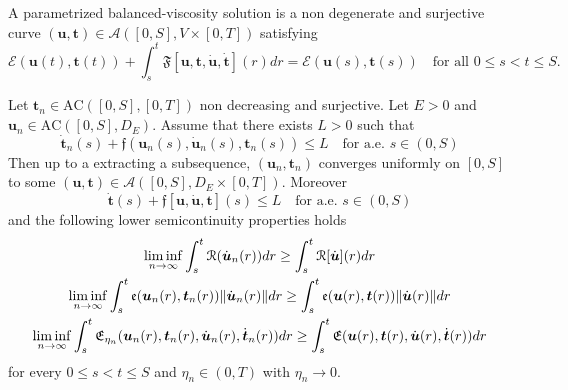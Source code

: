 \begin{defi}
A parametrized balanced-viscosity solution is a non degenerate and surjective curve $(\boldsymbol{u},\boldsymbol{t})\in\mathscr{A}([0,S],V\times[0,T])$ satisfying
\[
\mathcal{E}(\boldsymbol{u}(t),\boldsymbol{t}(t))+\int_s^t\mathfrak{F}[\boldsymbol{u},\boldsymbol{t},\dot{\boldsymbol{u}},\dot{\boldsymbol{t}}](r)dr=\mathcal{E}(\boldsymbol{u}(s),\boldsymbol{t}(s))\quad\text{for all $0\le s<t\le S$}.
\]
\end{defi}
\begin{lemma}
\label{lemma:compactness-parametrized}
Let $\boldsymbol{t}_n\in\text{AC}([0,S],[0,T])$ non decreasing and surjective. Let $E>0$ and $\boldsymbol{u}_n\in\text{AC}([0,S],D_E)$. Assume that there exists $L>0$ such that
\begin{equation}
\label{eqn:parametrized-curves-estimate-for-compactness}
\dot{\boldsymbol{t}}_n(s)+\mathfrak{f}(\boldsymbol{u}_n(s),\dot{\boldsymbol{u}}_n(s),\boldsymbol{t}_n(s))\le L\quad\text{for a.e.\ $s\in(0,S)$}
\end{equation}
Then up to a extracting a subsequence, $(\boldsymbol{u}_n,\boldsymbol{t}_n)$ converges uniformly on $[0,S]$ to some $(\boldsymbol{u},\boldsymbol{t})\in\mathscr{A}([0,S],D_E\times[0,T])$. Moreover
\[
\dot{\boldsymbol{t}}(s)+\mathfrak{f}[\boldsymbol{u},\dot{\boldsymbol{u}},\boldsymbol{t}](s)\le L\quad\text{for a.e.\ $s\in(0,S)$}
\]
and the following lower semicontinuity properties holds
\begin{gather*}
\liminf_{n\to\infty}\int_s^t\mathcal{R}(\dot{\boldsymbol{u}}_n(r))dr\ge\int_s^t\mathcal{R}[\dot{\boldsymbol{u}}](r)dr \\
\liminf_{n\to\infty}\int_s^t\mathfrak{e}(\boldsymbol{u}_n(r),\boldsymbol{t}_n(r))\lVert\dot{\boldsymbol{u}}_n(r)\rVert dr\ge\int_s^t\mathfrak{e}(\boldsymbol{u}(r),\boldsymbol{t}(r))\lVert\dot{\boldsymbol{u}}(r)\rVert dr \\
\liminf_{n\to\infty}\int_s^t\mathfrak{E}_{\eta_n}(\boldsymbol{u}_n(r),\boldsymbol{t}_n(r),\dot{\boldsymbol{u}}_n(r),\dot{\boldsymbol{t}}_n(r))dr\ge\int_s^t\mathfrak{E}(\boldsymbol{u}(r),\boldsymbol{t}(r),\dot{\boldsymbol{u}}(r),\dot{\boldsymbol{t}}(r))dr
\end{gather*}
for every $0\le s<t\le S$ and $\eta_n\in(0,T)$ with $\eta_n\to0$.
\end{lemma}
